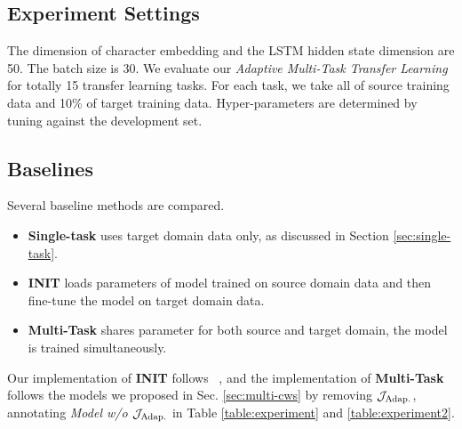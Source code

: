 \subsection{Experiment Settings}

The dimension of character embedding and the LSTM hidden state dimension are 50. The batch size is 30. We evaluate our \textit{Adaptive Multi-Task Transfer Learning} for totally 15 transfer learning tasks. For each task, we take all of source training data and 10\% of target training data. Hyper-parameters are determined by tuning against the development set.

\subsection{Baselines}

Several baseline methods are compared.
\begin{itemize}
\item \textbf{Single-task} uses target domain data only, as discussed in Section \ref{sec:single-task}.
\item \textbf{INIT} loads parameters of model trained on source domain data and then fine-tune the model on target domain data.
\item \textbf{Multi-Task} shares parameter for both source and target domain, the model is trained simultaneously.
\end{itemize}

\noindent Our implementation of \textbf{INIT} follows ~\citet{DBLP:journals/corr/MouMYLXZJ16}, and the implementation of \textbf{Multi-Task} follows the models we proposed in Sec. \ref{sec:multi-cws} by removing $\mathcal{J}_\textnormal{Adap.}$, annotating \textit{Model w/o $\mathcal{J}_\textnormal{Adap.}$} in Table \ref{table:experiment} and \ref{table:experiment2}.

